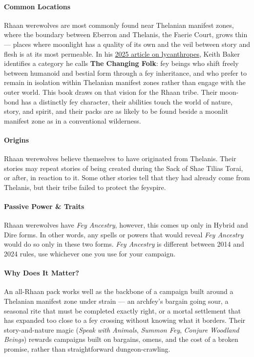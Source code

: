 \documentclass[twocolumn]{dndbook}
\begin{document}
\paragraph*{Common Locations} Rhaan werewolves are most commonly found near Thelanian manifest zones, where the boundary between Eberron and Thelanis, the Faerie Court, grows thin --- places where moonlight has a quality of its own and the veil between story and flesh is at its most permeable.
In his \href{https://keith-baker.com/2025-lycanthropes/}{2025 article on lycanthropes}, Keith Baker identifies a category he calls \textbf{The Changing Folk}: fey beings who shift freely between humanoid and bestial form through a fey inheritance, and who prefer to remain in isolation within Thelanian manifest zones rather than engage with the outer world.
This book draws on that vision for the Rhaan tribe. Their moon-bond has a distinctly fey character, their abilities touch the world of nature, story, and spirit, and their packs are as likely to be found beside a moonlit manifest zone as in a conventional wilderness.

\paragraph*{Origins} Rhaan werewolves believe themselves to have originated from Thelanis.
Their stories may repeat stories of being created during the Sack of Shae Tilias Torai, or after, in reaction to it.
Some other stories tell that they had already come from Thelanis, but their tribe failed to protect the feyspire.

\paragraph*{Passive Power \& Traits} Rhaan werewolves have \emph{Fey Ancestry}, however, this comes up only in Hybrid and Dire forms.
In other words, any spells or powers that would reveal \emph{Fey Ancestry} would do so only in these two forms.
\emph{Fey Ancestry} is different between 2014 and 2024 rules, use whichever one you use for your campaign.

\paragraph*{Why Does It Matter?} An all-Rhaan pack works well as the backbone of a campaign built around a Thelanian manifest zone under strain --- an archfey's bargain going sour, a seasonal rite that must be completed exactly right, or a mortal settlement that has expanded too close to a fey crossing without knowing what it borders.
Their story-and-nature magic (\emph{Speak with Animals}, \emph{Summon Fey}, \emph{Conjure Woodland Beings}) rewards campaigns built on bargains, omens, and the cost of a broken promise, rather than straightforward dungeon-crawling.
\end{document}
